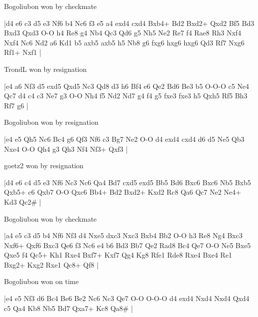 \showboard

Bogoliubon won by checkmate

\makegametitle
|d4 e6 c3 d5 e3 Nf6 b4 Nc6 f3 e5 a4 exd4 cxd4 Bxb4+ Bd2 Bxd2+ Qxd2 Bf5 Bd3 Bxd3 Qxd3 O-O h4 Re8 g4 Nb4 Qc3 Qd6 g5 Nh5 Ne2 Re7 f4 Rae8 Rh3 Nxf4 Nxf4 Nc6 Nd2 a6 Kd1 b5 axb5 axb5 h5 Nb8 g6 fxg6 hxg6 hxg6 Qd3 Rf7 Nxg6 Rf1+ Nxf1  |

\showboard

TrondL won by resignation

\makegametitle
|e4 a6 Nf3 d5 exd5 Qxd5 Nc3 Qd8 d3 h6 Bf4 e6 Qe2 Bd6 Be3 b5 O-O-O c5 Ne4 Qc7 d4 c4 c3 Ne7 g3 O-O Nh4 f5 Nd2 Nd7 g4 f4 g5 fxe3 fxe3 h5 Qxh5 Rf5 Bh3 Rf7 g6  |

\showboard

Bogoliubon won by resignation

\makegametitle
|e4 e5 Qh5 Nc6 Bc4 g6 Qf3 Nf6 c3 Bg7 Ne2 O-O d4 exd4 cxd4 d6 d5 Ne5 Qb3 Nxe4 O-O Qh4 g3 Qh3 Nf4 Nf3+ Qxf3  |

\showboard

goetz2 won by resignation

\makegametitle
|d4 e6 c4 d5 e3 Nf6 Nc3 Nc6 Qa4 Bd7 cxd5 exd5 Bb5 Bd6 Bxc6 Bxc6 Nb5 Bxb5 Qxb5+ c6 Qxb7 O-O Qxc6 Bb4+ Bd2 Bxd2+ Kxd2 Rc8 Qa6 Qc7 Ne2 Ne4+ Kd3 Qc2\#  |

\showboard

Bogoliubon won by checkmate

\makegametitle
|a4 e5 c3 d5 b4 Nf6 Nf3 d4 Nxe5 dxc3 Nxc3 Bxb4 Bb2 O-O h3 Re8 Ng4 Bxc3 Nxf6+ Qxf6 Bxc3 Qe6 f3 Nc6 e4 b6 Bd3 Bb7 Qe2 Rad8 Bc4 Qe7 O-O Ne5 Bxe5 Qxe5 f4 Qc5+ Kh1 Rxe4 Bxf7+ Kxf7 Qg4 Kg8 Rfe1 Rde8 Rxe4 Bxe4 Re1 Bxg2+ Kxg2 Rxe1 Qc8+ Qf8  |

\showboard

Bogoliubon won on time

\makegametitle
|e4 e5 Nf3 d6 Bc4 Be6 Be2 Nc6 Nc3 Qe7 O-O O-O-O d4 exd4 Nxd4 Nxd4 Qxd4 c5 Qa4 Kb8 Nb5 Bd7 Qxa7+ Kc8 Qa8\#  |

\showboard

